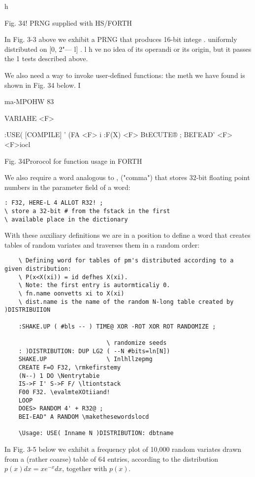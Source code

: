 h

Fig. 34! PRNG supplied with HS/FORTH

In Fig. 3-3 above we exhibit a PRNG that produces 16-bit intege .
uniformly distributed on [0, 2"— l] . l h ve no idea of its
operandi or its origin, but it passes the 1 tests described above.

We also need a way to invoke user-defined functions: the meth
we have found is shown in Fig. 34 below. I

ma-MPOHW 83

 

VARIAHE <F>

:USE( [COMPILE] ' (FA <F> i
:F(X) <F> BtECUTE® ;
BEI'EAD' <F> \rrllto<F>iocl

 

 

 

Fig. 34Prorocol for function usage in FORTH

We also require a word analogous to , ("comma") that stores
32-bit floating point numbers in the parameter field of a word:

\begin{verbatim}
: F32, HERE-L 4 ALLOT R32! ;
\ store a 32-bit # from the fstack in the first
\ available place in the dictionary
\end{verbatim}

With these auxiliary definitions we are in a position to define a
word that creates tables of random variates and traverses them in a random order:

\begin{verbatim}
	\ Defining word for tables of pm's distributed according to a given distribution:
	\ P(x<X(xi)) = id defhes X(xi).
	\ Note: the first entry is autormticaliy 0.  
	\ fn.name oonvetts xi to X(xi) 
	\ dist.name is the name of the random N-long table created by )DISTRIBUIION

	:SHAKE.UP ( #bls -- ) TIME@ XOR -ROT XOR ROT RANDOMIZE ;

							 \ randomize seeds
	: )DISTRIBUTION: DUP LG2 ( --N #bits=ln[N])
	SHAKE.UP                 \ Inlhllzepmg
	CREATE F=O F32, \rmkefirstemy
	(N--) 1 DO \Nentrytabie
	IS->F I' S->F F/ \ltiontstack
	F00 F32. \evalmteXOtiiand!
	LOOP
	DOES> RANDOM 4' + R32@ ;
	BEI-EAD" A RANDOM \makethesewordslocd

	\Usage: USE( Inname N )DISTRIBUTION: dbtname
\end{verbatim}
In Fig. 3-5 below we exhibit a frequency plot of 10,000 random
variates drawn from a (rather coarse) table of 64 entries, according to the
distribution $p(x)dx=xe^{-x}dx$, together with $p(x)$.

